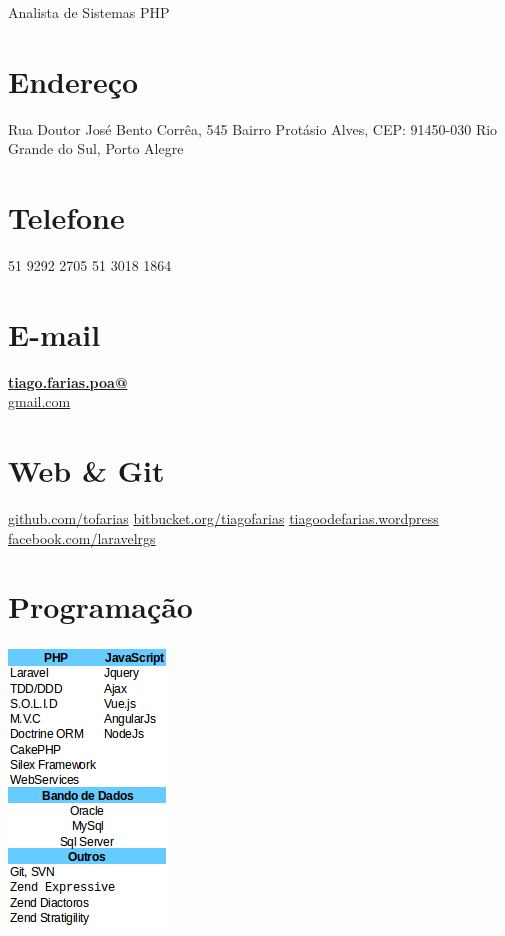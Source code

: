 \documentclass[]{friggeri-cv}
\begin{document}
      {Analista de Sistemas PHP}
      

\begin{aside}
  \section{Endereço}  	
    Rua Doutor José Bento Corrêa, 545
    Bairro Protásio Alves,
    CEP: 91450-030
    Rio Grande do Sul, Porto Alegre
    ~
  \section{Telefone}
    51 9292 2705
    51 3018 1864
    ~
  \section{E-mail}
    \href{mailto:tiago.farias.poa@gmail.com}{\textbf{tiago.farias.poa@}\\gmail.com}
    ~
  \section{Web \& Git}
    \href{https://github.com/tofarias}{github.com/tofarias}
    \href{https://bitbucket.org/tiagofarias}{bitbucket.org/tiagofarias}
    \href{https://tiagoodefarias.wordpress.com/}{tiagoodefarias.wordpress}
    \href{https://www.facebook.com/groups/laravelrgs}{facebook.com/laravelrgs}
    ~
  \section{Programação}
    \includegraphics[scale=0.62]{img/techinical-skills.png}
    ~

\end{aside}
\end{document}
